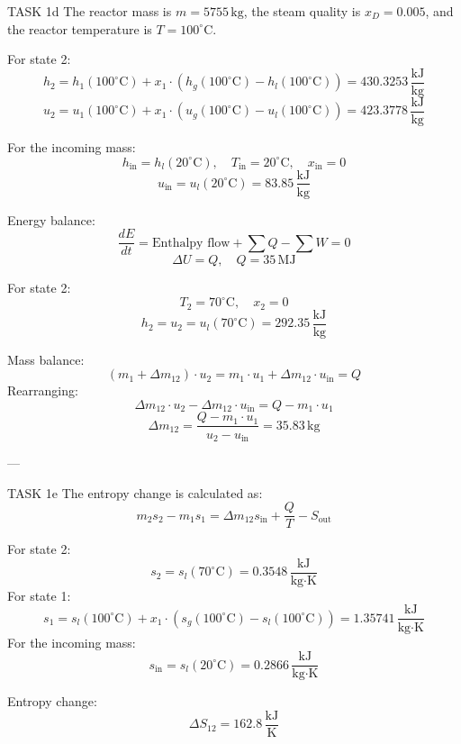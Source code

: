 TASK 1d  
The reactor mass is \( m = 5755 \, \text{kg} \), the steam quality is \( x_D = 0.005 \), and the reactor temperature is \( T = 100^\circ\text{C} \).  

For state 2:  
\[
h_2 = h_1(100^\circ\text{C}) + x_1 \cdot \left( h_g(100^\circ\text{C}) - h_l(100^\circ\text{C}) \right) = 430.3253 \, \frac{\text{kJ}}{\text{kg}}
\]  
\[
u_2 = u_1(100^\circ\text{C}) + x_1 \cdot \left( u_g(100^\circ\text{C}) - u_l(100^\circ\text{C}) \right) = 423.3778 \, \frac{\text{kJ}}{\text{kg}}
\]  

For the incoming mass:  
\[
h_{\text{in}} = h_l(20^\circ\text{C}), \quad T_{\text{in}} = 20^\circ\text{C}, \quad x_{\text{in}} = 0
\]  
\[
u_{\text{in}} = u_l(20^\circ\text{C}) = 83.85 \, \frac{\text{kJ}}{\text{kg}}
\]  

Energy balance:  
\[
\frac{dE}{dt} = \text{Enthalpy flow} + \sum Q - \sum W = 0
\]  
\[
\Delta U = Q, \quad Q = 35 \, \text{MJ}
\]  

For state 2:  
\[
T_2 = 70^\circ\text{C}, \quad x_2 = 0
\]  
\[
h_2 = u_2 = u_l(70^\circ\text{C}) = 292.35 \, \frac{\text{kJ}}{\text{kg}}
\]  

Mass balance:  
\[
(m_1 + \Delta m_{12}) \cdot u_2 = m_1 \cdot u_1 + \Delta m_{12} \cdot u_{\text{in}} = Q
\]  
Rearranging:  
\[
\Delta m_{12} \cdot u_2 - \Delta m_{12} \cdot u_{\text{in}} = Q - m_1 \cdot u_1
\]  
\[
\Delta m_{12} = \frac{Q - m_1 \cdot u_1}{u_2 - u_{\text{in}}} = 35.83 \, \text{kg}
\]  

---

TASK 1e  
The entropy change is calculated as:  
\[
m_2 s_2 - m_1 s_1 = \Delta m_{12} s_{\text{in}} + \frac{Q}{T} - S_{\text{out}}
\]  

For state 2:  
\[
s_2 = s_l(70^\circ\text{C}) = 0.3548 \, \frac{\text{kJ}}{\text{kg·K}}
\]  
For state 1:  
\[
s_1 = s_l(100^\circ\text{C}) + x_1 \cdot \left( s_g(100^\circ\text{C}) - s_l(100^\circ\text{C}) \right) = 1.35741 \, \frac{\text{kJ}}{\text{kg·K}}
\]  
For the incoming mass:  
\[
s_{\text{in}} = s_l(20^\circ\text{C}) = 0.2866 \, \frac{\text{kJ}}{\text{kg·K}}
\]  

Entropy change:  
\[
\Delta S_{12} = 162.8 \, \frac{\text{kJ}}{\text{K}}
\]